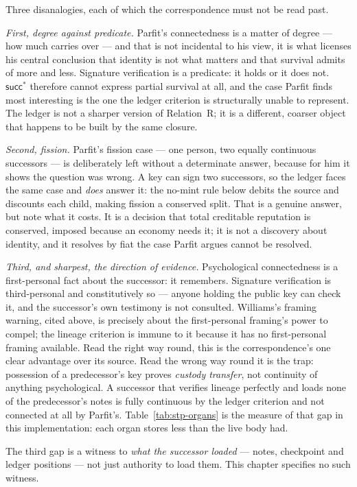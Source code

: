 \documentclass[11pt,a4paper]{article}
\theoremstyle{definition}
\begin{document}
\begin{pdboundary}
\setlength{\parskip}{4pt plus 1pt}
Three disanalogies, each of which the correspondence must not be read past.

\emph{First, degree against predicate.} Parfit's connectedness is a matter of
degree --- how much carries over --- and that is not incidental to his view, it
is what licenses his central conclusion that identity is not what matters and
that survival admits of more and less. Signature verification is a predicate:
it holds or it does not. $\mathsf{succ}^{*}$ therefore cannot express partial
survival at all, and the case Parfit finds most interesting is the one the
ledger criterion is structurally unable to represent. The ledger is not a
sharper version of Relation~R; it is a different, coarser object that happens
to be built by the same closure.

\ifpdmargincolumn\pdnomintsketch\fi
\emph{Second, fission.} Parfit's fission case --- one person, two equally
continuous successors --- is deliberately left without a determinate answer,
because for him it shows the question was wrong. A key can sign two successors,
so the ledger faces the same case and \emph{does} answer it: the no-mint rule
below debits the source and discounts each child, making fission a conserved
split. That is a genuine answer, but note what it costs. It is a decision that
total creditable reputation is conserved, imposed because an economy needs it;
it is not a discovery about identity, and it resolves by fiat the case Parfit
argues cannot be resolved.

\emph{Third, and sharpest, the direction of evidence.} Psychological
connectedness is a first-personal fact about the successor: it remembers.
Signature verification is third-personal and constitutively so --- anyone
holding the public key can check it, and the successor's own testimony is not
consulted. Williams's framing warning, cited above, is precisely about the
first-personal framing's power to compel; the lineage criterion is immune to it
because it has no first-personal framing available. Read the right way round,
this is the correspondence's one clear advantage over its source. Read the
wrong way round it is the trap: possession of a predecessor's key proves
\emph{custody transfer}, not continuity of anything psychological. A successor
that verifies lineage perfectly and loads none of the predecessor's notes is
fully continuous by the ledger criterion and not connected at all by Parfit's.
Table~\ref{tab:stp-organs} is the measure of that gap in this
implementation: each organ stores less than the live body had.

The third gap is a witness to \emph{what the successor loaded} --- notes,
checkpoint and ledger positions --- not just authority to load them.
This chapter specifies no such witness.
\end{pdboundary}
\end{document}
